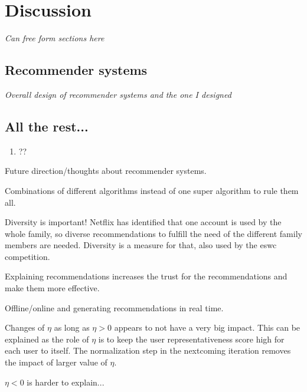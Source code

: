 \chapter{Discussion}\label{cha:discussion}

\textit{Can free form sections here}

\section{Recommender systems}

\textit{Overall design of recommender systems and the one I designed}

\section{All the rest...}

\begin{enumerate}
    \item ??
\end{enumerate}




Future direction/thoughts about recommender systems.

Combinations of different algorithms instead of one super algorithm to rule them all.

Diversity is important! Netflix has identified that one account is used by the whole family, so diverse recommendations to fulfill the need of the different family members are needed. Diversity is a measure for that, also used by the eswc competition.

Explaining recommendations increases the trust for the recommendations and make them more effective.

Offline/online and generating recommendations in real time.

Changes of $\eta$ as long as $\eta > 0$ appears to not have a very big impact. This can be explained as the role of $\eta$ is to keep the user representativeness score high for each user to itself. The normalization step in the nextcoming iteration removes the impact of larger value of $\eta$.

$\eta < 0 $ is harder to explain...

